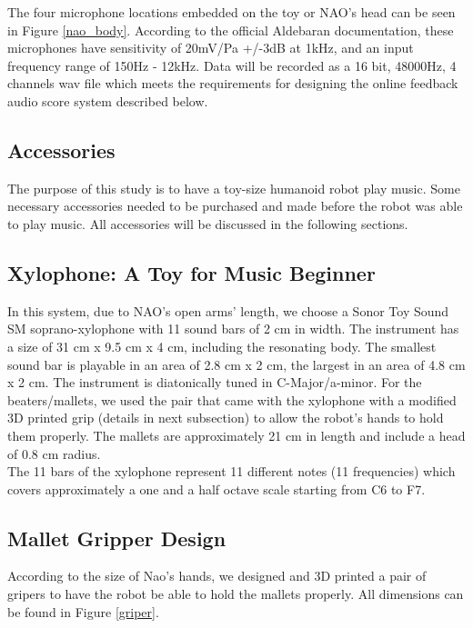 \documentclass[conference]{IEEEtran}
\begin{document}
The four microphone locations embedded on the toy or NAO's head can be seen in Figure \ref{nao_body}. 
According to the official Aldebaran documentation, these microphones have sensitivity 
of 20mV/Pa +/-3dB at 1kHz, and an input frequency range of 150Hz - 12kHz. Data 
will be recorded as a 16 bit, 48000Hz, 4 channels wav file which meets the 
requirements for designing the online feedback audio score system described below.\\


\subsection{Accessories}
The purpose of this study is to have a toy-size humanoid robot play music. Some necessary accessories 
needed to be purchased and made before the robot was able to play music. 
All accessories will be discussed in the following sections.\\

\subsection{Xylophone: A Toy for Music Beginner}
In this system, due to NAO's open arms' length, we choose a Sonor Toy Sound SM 
soprano-xylophone with 11 sound bars of 2 cm in width. The instrument has a size of 
31 cm x 9.5 cm x 4 cm, including the resonating body. The smallest sound bar is 
playable in an area of 2.8 cm x 2 cm, the largest in an area of 4.8 cm x 2 cm. The 
instrument is diatonically tuned in C-Major/a-minor. For the beaters/mallets, we used 
the pair that came with the xylophone with a modified 3D printed grip (details in next 
subsection) to allow the robot's hands to hold them properly. The mallets 
are approximately 21 cm in length and include a head of 0.8 cm radius.\\ 


The 11 bars of the xylophone represent 11 different notes (11 frequencies) which covers 
approximately a one and a half octave scale starting from C6 to F7. \\

\subsection{Mallet Gripper Design}
According to the size of Nao's hands, we designed and 3D printed a pair of gripers to 
have the robot be able to hold the mallets properly. All dimensions can be found 
in Figure \ref{griper}.\\
\end{document}
